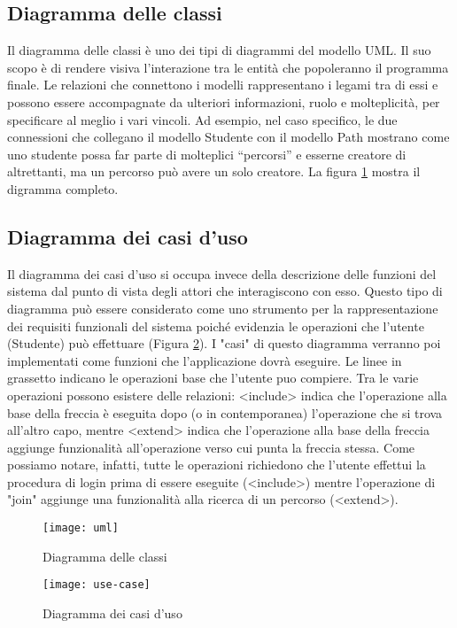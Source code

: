 \subsection{Diagramma delle classi}
Il diagramma delle classi è uno dei tipi di diagrammi del modello UML. Il suo scopo è di rendere visiva l’interazione tra le entità che popoleranno il programma finale. Le relazioni che connettono i modelli rappresentano i legami tra di essi e possono essere accompagnate da ulteriori informazioni, ruolo e molteplicità, per specificare al meglio i vari vincoli.
Ad esempio, nel caso specifico, le due connessioni che collegano il modello Studente con il modello Path mostrano come uno studente possa far parte di molteplici “percorsi” e esserne creatore di altrettanti, ma un percorso può avere un solo creatore. 
La figura  \ref{fig:uml} mostra il digramma completo.

\subsection{Diagramma dei casi d'uso}
Il diagramma dei casi d’uso si occupa invece della descrizione delle funzioni del sistema dal punto di vista degli attori che interagiscono con esso. Questo tipo di diagramma può essere considerato come uno strumento per la rappresentazione dei requisiti funzionali del sistema poiché evidenzia le operazioni che l’utente (Studente) può effettuare (Figura \ref{fig:use-case}).
I "casi" di questo diagramma verranno poi implementati come funzioni che l'applicazione dovrà eseguire.
Le linee in grassetto indicano le operazioni base che l'utente puo compiere.
Tra le varie operazioni possono esistere delle relazioni: <include> indica che l'operazione alla base della freccia è eseguita dopo (o in contemporanea) l'operazione che si trova all'altro capo, mentre <extend> indica che l'operazione alla base della freccia aggiunge funzionalità all'operazione verso cui punta la freccia stessa.
Come possiamo notare, infatti, tutte le operazioni richiedono che l'utente effettui la procedura di login prima di essere eseguite (<include>) mentre l'operazione di "join" aggiunge una funzionalità alla ricerca di un percorso (<extend>).

\begin{figure}[!hb]
  \centering
    \texttt{[image: uml]}
  \caption{Diagramma delle classi}
  \label{fig:uml}
\end{figure}

\begin{figure}[!hb]
  \centering
    \texttt{[image: use-case]}
  \caption{Diagramma dei casi d'uso}
  \label{fig:use-case}
\end{figure}